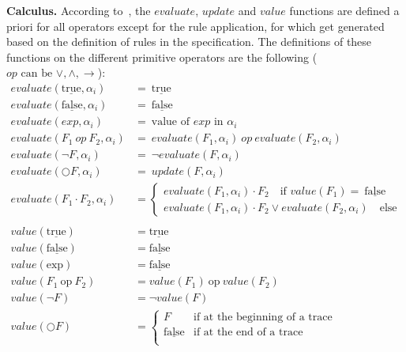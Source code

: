 \documentclass[english]{article}
\begin{document}
\textbf{Calculus.} According to~\cite{barringer2004rule}, the $evaluate$, $update$ and $value$ functions are defined a priori for all operators except for the
rule application, for which get generated based on the definition of rules in the specification. The definitions of these functions on the different primitive operators are the following ($op\text{ can be }\lor , \land, \rightarrow $):
{\allowdisplaybreaks
\begin{align*}
    evaluate(\underline{\text{true}},\alpha_i) & =\ \underline{\text{true}} \\
    evaluate(\underline{\text{false}},\alpha_i) & =\ \underline{\text{false}} \\ 
    evaluate(exp,\alpha_i) & =\ \text{value of } exp\text{ in } \alpha_i \\
    evaluate(F_1\ op\ F_2,\alpha_i) & =\  evaluate(F_1,\alpha_i)\ op\ evaluate(F_2,\alpha_i)\\
    evaluate(\neg{F},\alpha_i) & =\ \neg{evaluate(F,\alpha_i)}  \\
    evaluate(\bigcirc F,\alpha_i) & =\ update(F,\alpha_i)  \\
    evaluate(F_1 \cdot F_2,\alpha_i) & =
    \begin{cases}
        evaluate(F_1,\alpha_i)\cdot F_2 \quad \text{if } value(F_1)=\ \underline{\text{false}} \\
        evaluate(F_1,\alpha_i)\cdot F_2 \lor evaluate(F_2,\alpha_i)\quad \text{else} 
    \end{cases} \\ \\
        value(\underline{\text{true}}) & = \underline{\text{true}} \\
        value(\underline{\text{false}}) & = \underline{\text{false}} \\ 
        value(\text{exp}) & = \underline{\text{false}} \\
        value(F_1\ \text{op}\ F_2) & = value(F_1)\ \text{op}\ value(F_2) \\
        value(\neg{F}) & = \neg{value(F)}  \\
        value(\bigcirc F) & =
        \begin{cases}
            F & \text{if at the beginning of a trace} \\
            \underline{\text{false}} & \text{if at the end of a trace} \\

\end{cases}
\end{align*}}
\end{document}
